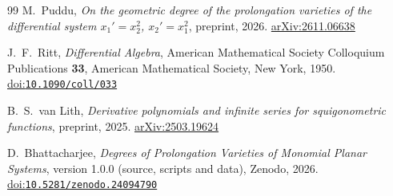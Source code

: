 \documentclass[11pt]{amsart}
\theoremstyle{definition}
\theoremstyle{remark}
\numberwithin{equation}{section}
\providecommand{\doi}[1]{\href{https://doi.org/#1}{doi:\nolinkurl{#1}}}
\begin{document}
\begin{thebibliography}{99}
 M.~Puddu, \emph{On the geometric degree of the prolongation varieties of the differential system $x_1'=x_2^2$, $x_2'=x_1^2$}, preprint, 2026. \href{https://arxiv.org/abs/2611.06638}{arXiv:2611.06638}

 J.~F.~Ritt, \emph{Differential Algebra}, American Mathematical Society Colloquium Publications \textbf{33}, American Mathematical Society, New York, 1950. \doi{10.1090/coll/033}

 B.~S.~van Lith, \emph{Derivative polynomials and infinite series for squigonometric functions}, preprint, 2025. \href{https://arxiv.org/abs/2503.19624}{arXiv:2503.19624}

 D.~Bhattacharjee, \emph{Degrees of Prolongation Varieties of Monomial Planar Systems}, version 1.0.0 (source, scripts and data), Zenodo, 2026. \doi{10.5281/zenodo.24094790}

\end{thebibliography}
\endgroup
\end{document}
